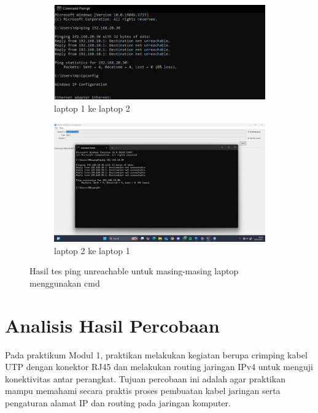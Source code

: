 \begin{figure}[H]
    \centering
    \begin{subfigure}[b]{0.3\linewidth}
      \centering
      \includegraphics[width=\linewidth]{image/routing5.png}
      \caption{laptop 1 ke laptop 2}
    \end{subfigure}
    \hspace{1cm}
    \begin{subfigure}[b]{0.3\linewidth}
      \centering
      \includegraphics[width=\linewidth]{image/routing6.jpg}
      \caption{laptop 2 ke laptop 1}
    \end{subfigure}
    \caption{Hasil tes ping unreachable untuk masing-masing laptop menggunakan cmd}
\end{figure}

\section{Analisis Hasil Percobaan}
Pada praktikum Modul 1, praktikan melakukan kegiatan berupa crimping kabel UTP dengan konektor RJ45 dan melakukan routing jaringan IPv4 untuk menguji konektivitas antar perangkat. Tujuan percobaan ini adalah agar praktikan mampu memahami secara praktis proses pembuatan kabel jaringan serta pengaturan alamat IP dan routing pada jaringan komputer. 
